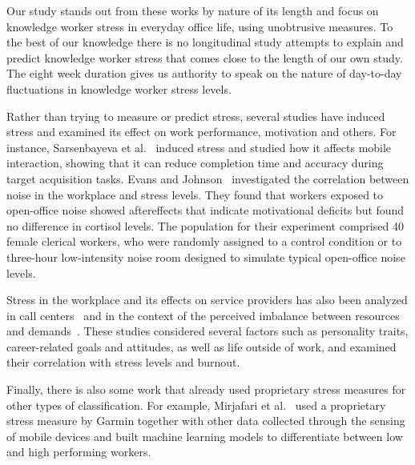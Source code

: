 Our study stands out from these works by nature of its length and focus on knowledge worker stress in everyday office life, using unobtrusive measures. To the best of our knowledge there is no longitudinal study  attempts to explain and predict knowledge worker stress that comes close to the length of our own study. The eight week duration gives us authority to speak on the nature of day-to-day fluctuations in knowledge worker stress levels.


Rather than trying to measure or predict stress, several studies have induced stress and examined its effect on work performance, motivation and others. For instance, Sarsenbayeva et al.~\cite{Sarsenbayeva19} induced stress and studied how it affects mobile interaction, showing that it can reduce completion time and accuracy during target acquisition tasks. Evans and Johnson~\cite{evans00} investigated the correlation between noise in the workplace and stress levels. They found that workers exposed to open-office noise showed aftereffects that indicate motivational deficits but found no difference in cortisol levels. The population for their experiment comprised 40 female clerical workers, who were randomly assigned to a control condition or to three-hour low-intensity noise room designed to simulate typical open-office noise levels.

Stress in the workplace and its effects on service providers has also been analyzed in call centers~\cite{Hernandez11} and in the context of the perceived imbalance between resources and demands~\cite{cherniss80}. These studies considered several factors such as personality traits, career-related goals and attitudes, as well as life outside of work, and examined their correlation with stress levels and burnout.

Finally, there is also some work that already used proprietary stress measures for other types of classification. For example, Mirjafari et al.~\cite{Mirjafari19} used a proprietary stress measure by Garmin together with other data collected through the sensing of mobile devices and built machine learning models to differentiate between low and high performing workers.



